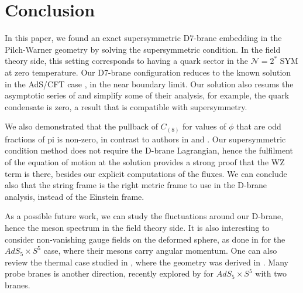 \section{Conclusion}

In this paper, we found an exact supersymmetric D7-brane embedding in the Pilch-Warner geometry by solving the supersymmetric condition. In the field theory side, this setting corresponds to having a quark sector in the $\mathcal{N}=2^*$ SYM at zero temperature. Our D7-brane configuration reduces to the known solution in the AdS/CFT case \cite{Karch:2005ms}, in the near boundary limit. Our solution also resums the asymptotic series of \cite{Albash:2011nw} and simplify some of their analysis, for example, the quark condensate is zero, a result that is compatible with supersymmetry. 

We also demonstrated that the pullback of $C_{(8)}$ for values of $\phi$ that are odd fractions of pi is non-zero, in contrast to authors in \cite{Albash:2011nw} and \cite{Evans:2005ti}. Our supersymmetric condition method does not require the D-brane Lagrangian, hence the fulfilment of the equation of motion at the solution provides a strong proof that the WZ term is there, besides our explicit computations of the fluxes. We can conclude also that the string frame is the right metric frame to use in the D-brane analysis, instead of the Einstein frame. 

As a possible future work, we can study the fluctuations around our D-brane, hence the meson spectrum in the field theory side. 
It is also interesting to consider non-vanishing gauge fields on the deformed sphere, as done in \cite{Kruczenski:2003be} for the $AdS_5 \times S^5$ case, where their mesons carry angular momentum. One can also review the thermal case studied in \cite{Albash:2011dq}, where the geometry was derived in \cite{Buchel:2003ah}. Many probe branes is another direction, recently explored by \cite{Faedo:2019jlp} for $AdS_5 \times S^5$ with two branes.


